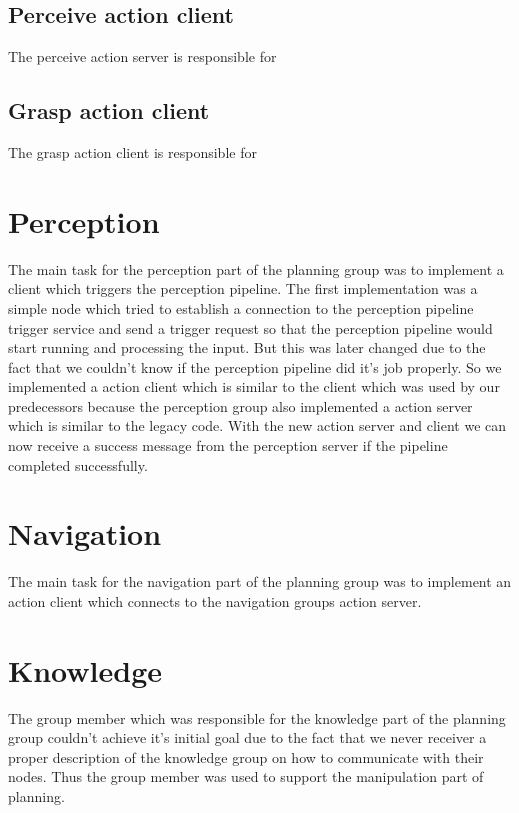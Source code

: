 \documentclass[main.tex]{subfiles}
\begin{document}
                \subsection{Perceive action client}

		The perceive action server is responsible for

		\subsection{Grasp action client}

		The grasp action client is responsible for

		\section{Perception}

		The main task for the perception part of the planning group was to implement a client which triggers the perception pipeline.
		The first implementation was a simple node which tried to establish a connection to the perception pipeline trigger service and send a trigger request so that the perception pipeline would start running and processing the input. But this was later changed due to the fact that we couldn't know if the perception pipeline did it's job properly.
		So we implemented a action client which is similar to the client which was used by our predecessors because the perception group also implemented a action server which is similar to the legacy code. With the new action server and client we can now receive a success message from the perception server if the pipeline completed successfully.

		\section{Navigation}

                The main task for the navigation part of the planning group was to implement an action client which connects to the navigation groups action server.

		\section{Knowledge}

                The group member which was responsible for the knowledge part of the planning group couldn't achieve it's initial goal due to the fact that we never receiver a proper description of the knowledge group on how to communicate with their nodes. Thus the group member was used to support the manipulation part of planning.
\end{document}
